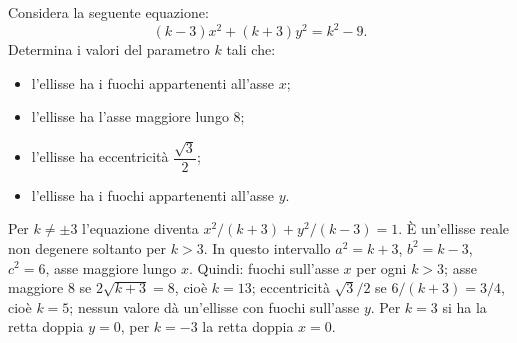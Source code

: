 
\begin{esercizio}
Considera la seguente equazione:
    \[(k-3)x^2+(k+3)y^2 = k^2-9.\]
    Determina i valori del parametro $k$ tali che:
        \begin{itemize}
            \item l'ellisse ha i fuochi appartenenti all'asse $x$;
            \item l'ellisse ha l'asse maggiore lungo $8$;
            \item l'ellisse ha eccentricità $\dfrac{\sqrt{3}}{2}$;
            \item l'ellisse ha i fuochi appartenenti all'asse $y$.
        \end{itemize}
\end{esercizio}

\begin{soluzione}
Per $k\ne\pm3$ l'equazione diventa $x^2/(k+3)+y^2/(k-3)=1$.
È un'ellisse reale non degenere soltanto per $k>3$.
In questo intervallo $a^2=k+3$, $b^2=k-3$, $c^2=6$, asse maggiore lungo $x$.
Quindi: fuochi sull'asse $x$ per ogni $k>3$;
asse maggiore 8 se $2\sqrt{k+3}=8$, cioè $k=13$;
eccentricità $\sqrt3/2$ se $6/(k+3)=3/4$, cioè $k=5$;
nessun valore dà un'ellisse con fuochi sull'asse $y$.
Per $k=3$ si ha la retta doppia $y=0$, per $k=-3$ la retta doppia $x=0$.
\end{soluzione}
